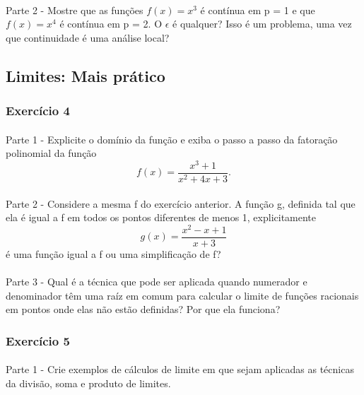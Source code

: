 \documentclass{article}
\begin{document}
\paragraph{} Parte 2 - Mostre que as fun\c c\~oes $f(x) = x^3$ \'e cont\'inua em p = 1 e que $f(x) = x^4$ \'e cont\'inua em p = 2. O $\epsilon$ \'e qualquer? Isso \'e um problema, uma vez que continuidade \'e uma an\'alise local?

\subsection{Limites: Mais pr\'atico} 
\subsubsection{Exerc\'icio 4} 
\paragraph{} Parte 1 - Explicite o dom\'inio da fun\c c\~ao e exiba o passo a passo da fatora\c c\~ao polinomial da fun\c c\~ao
$$
f(x) = \frac{x^3 + 1}{x^2  + 4x + 3}.
$$

\paragraph{} Parte 2 - Considere a mesma f do exerc\'icio anterior. A fun\c c\~ao g, definida tal que ela \'e igual a f em todos os pontos diferentes de menos 1, explicitamente
$$
g(x) = \frac{x^2 - x + 1}{x + 3}
$$
\'e uma fun\c c\~ao igual a f ou uma simplifica\c c\~ao de f?

\paragraph{} Parte 3 - Qual \'e a t\'ecnica que pode ser aplicada quando numerador e denominador t\^em uma ra\'iz em comum para calcular o limite de fun\c c\~oes racionais em pontos onde elas n\~ao est\~ao definidas? Por que ela funciona?

\subsubsection{Exerc\'icio 5}
\paragraph{} Parte 1 - Crie exemplos de c\'alculos de limite em que sejam aplicadas as t\'ecnicas da divis\~ao, soma e produto de limites. 
\end{document}
